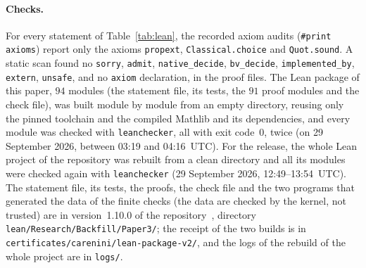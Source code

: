 \documentclass[11pt]{article}
\theoremstyle{remark}
\newcommand{\repoversion}{1.10.0}
\begin{document}
\paragraph{Checks.}
For every statement of Table~\ref{tab:lean}, the recorded axiom audits
(\texttt{\#print axioms}) report only the axioms \texttt{propext},
\texttt{Classical.choice} and \texttt{Quot.sound}. A static scan found no
\texttt{sorry}, \texttt{admit}, \texttt{native\_decide}, \texttt{bv\_decide},
\texttt{implemented\_by}, \texttt{extern}, \texttt{unsafe}, and no
\texttt{axiom} declaration, in the proof files. The Lean package of this paper,
$94$ modules (the statement file, its tests, the $91$ proof modules and the
check file), was built module by module from an empty directory, reusing only
the pinned toolchain and the compiled Mathlib and its dependencies, and every
module was checked with \texttt{leanchecker}, all with exit code~$0$, twice
(on 29 September 2026, between 03:19 and 04:16~UTC). For the release, the
whole Lean project of the repository was rebuilt from a clean directory and
all its modules were checked again with \texttt{leanchecker} (29 September
2026, 12:49--13:54~UTC). The statement file, its tests, the proofs, the check
file and the two programs that generated the data of the finite checks (the
data are checked by the kernel, not trusted) are in version~\repoversion{} of
the repository~\cite{repo}, directory \texttt{lean/Research/Backfill/Paper3/};
the receipt of the two builds is in \texttt{certificates/carenini/lean-package-v2/},
and the logs of the rebuild of the whole project are in \texttt{logs/}.
\end{document}
